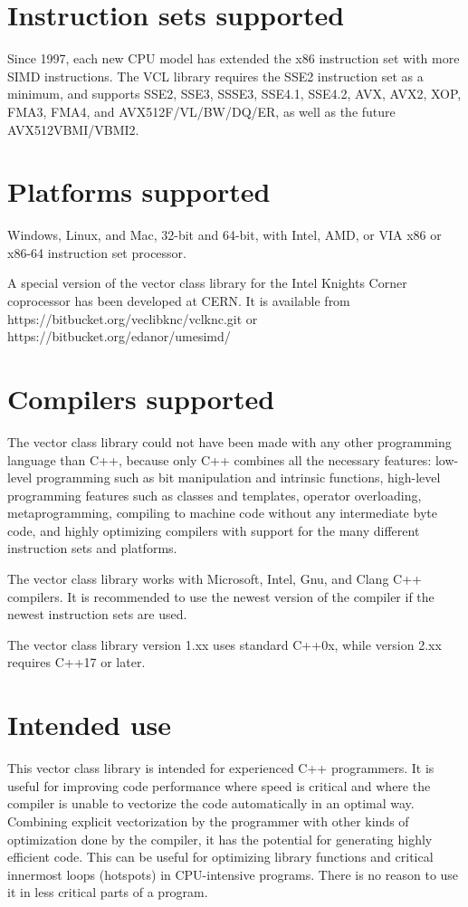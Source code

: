 \documentclass[vcl_manual.tex]{subfiles}
\begin{document}
\section{Instruction sets supported} \label{InstructionSetsSupported}
Since 1997, each new CPU model has extended the x86 instruction set with more SIMD instructions. The VCL library requires the SSE2 instruction set as a minimum, and supports SSE2, SSE3, SSSE3, SSE4.1, SSE4.2, AVX, AVX2, XOP, FMA3, FMA4, and AVX512F/VL/BW/DQ/ER, as well as the future AVX512VBMI/VBMI2.

\section{Platforms supported} \label{PlatformsSupported}
Windows, Linux, and Mac, 32-bit and 64-bit, with Intel, AMD, or VIA x86 or x86-64 instruction set processor.

A special version of the vector class library for the Intel Knights Corner coprocessor has been developed at CERN. It is available from
https://bitbucket.org/veclibknc/vclknc.git or 
https://bitbucket.org/edanor/umesimd/

\section{Compilers supported} \label{CompilersSupported}
The vector class library could not have been made with any other programming language than C++, because only C++ combines all the necessary features: low-level programming such as bit manipulation and intrinsic functions, high-level programming features such as classes and templates, operator overloading, metaprogramming, compiling to machine code without any intermediate byte code, and highly optimizing compilers with support for the many different instruction sets and platforms.

The vector class library works with Microsoft, Intel, Gnu, and Clang C++ compilers. It is recommended to use the newest version of the compiler if the newest instruction sets are used.

The vector class library version 1.xx uses standard C++0x, while version 2.xx requires C++17 or later.

\section{Intended use} \label{IntendedUse}
This vector class library is intended for experienced C++ programmers. It is useful for improving code performance where speed is critical and where the compiler is unable to vectorize the code automatically in an optimal way. Combining explicit vectorization by the programmer with other kinds of optimization done by the compiler, it has the potential for generating highly efficient code. This can be useful for optimizing library functions and critical innermost loops (hotspots) in CPU-intensive programs. There is no reason to use it in less critical parts of a program.
\end{document}
